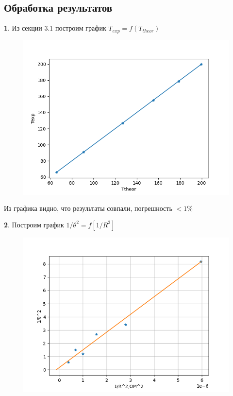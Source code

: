 \documentclass[a4paper,12pt]{article}
\theoremstyle{definition}
\begin{document}
\subsection{Обработка результатов}
\textbf{1}. Из секции 3.1 построим график $T_{exp}=f(T_{theor})$
\begin{figure}[H]
    \centering
    \includegraphics{324 1.png}    
\end{figure}
Из графика видно, что результаты совпали, погрешность $
<1\%$ \par
\textbf{2}.
Построим график $1/\theta^2=f[1/R^2]$
\begin{figure}[H]
    \centering
    \includegraphics{324 2.png}    
\end{figure} \par
\end{document}
